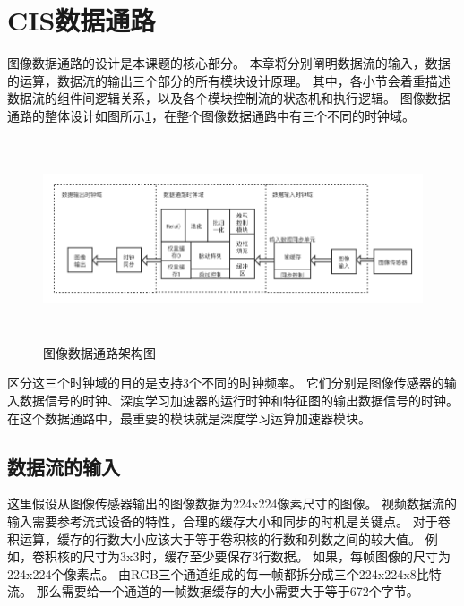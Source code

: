 \section{CIS数据通路}
图像数据通路的设计是本课题的核心部分。
本章将分别阐明数据流的输入，数据的运算，数据流的输出三个部分的所有模块设计原理。
其中，各小节会着重描述数据流的组件间逻辑关系，以及各个模块控制流的状态机和执行逻辑。
图像数据通路的整体设计如图所示\ref{fig:image_datapath}，在整个图像数据通路中有三个不同的时钟域。
\begin{figure}[htbp]
    \centering
    \includegraphics[width=15cm,height=6cm]{figures/image_datapath.png}
    \caption{图像数据通路架构图}
    \label{fig:image_datapath}
\end{figure}
区分这三个时钟域的目的是支持3个不同的时钟频率。
它们分别是图像传感器的输入数据信号的时钟、深度学习加速器的运行时钟和特征图的输出数据信号的时钟。
在这个数据通路中，最重要的模块就是深度学习运算加速器模块。


\subsection{数据流的输入}

这里假设从图像传感器输出的图像数据为224x224像素尺寸的图像。
视频数据流的输入需要参考流式设备的特性，合理的缓存大小和同步的时机是关键点。
对于卷积运算，缓存的行数大小应该大于等于卷积核的行数和列数之间的较大值。
例如，卷积核的尺寸为3x3时，缓存至少要保存3行数据。
如果，每帧图像的尺寸为224x224个像素点。
由RGB三个通道组成的每一帧都拆分成三个224x224x8比特流。
那么需要给一个通道的一帧数据缓存的大小需要大于等于672个字节。


